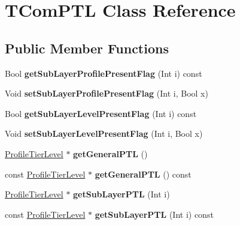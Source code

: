 \hypertarget{class_t_com_p_t_l}{}\section{T\+Com\+P\+TL Class Reference}
\label{class_t_com_p_t_l}
\subsection*{Public Member Functions}
\begin{DoxyCompactItemize}
\item 
\mbox{\label{class_t_com_p_t_l_a49a1ec26afd620b9fd1f248842a84b3d}} 
Bool {\bfseries get\+Sub\+Layer\+Profile\+Present\+Flag} (Int i) const
\item 
\mbox{\label{class_t_com_p_t_l_a55272dad771a9d43506e939a29630022}} 
Void {\bfseries set\+Sub\+Layer\+Profile\+Present\+Flag} (Int i, Bool x)
\item 
\mbox{\label{class_t_com_p_t_l_a6bc4f31d0371eaffe497c1a7c231d508}} 
Bool {\bfseries get\+Sub\+Layer\+Level\+Present\+Flag} (Int i) const
\item 
\mbox{\label{class_t_com_p_t_l_a452eea9f0b88a06fc890938247e2e652}} 
Void {\bfseries set\+Sub\+Layer\+Level\+Present\+Flag} (Int i, Bool x)
\item 
\mbox{\label{class_t_com_p_t_l_adbca26843f058ebc9b0bbd954c105e83}} 
\hyperlink{class_profile_tier_level}{Profile\+Tier\+Level} $\ast$ {\bfseries get\+General\+P\+TL} ()
\item 
\mbox{\label{class_t_com_p_t_l_ade956101723fc0b344db57b66f2756de}} 
const \hyperlink{class_profile_tier_level}{Profile\+Tier\+Level} $\ast$ {\bfseries get\+General\+P\+TL} () const
\item 
\mbox{\label{class_t_com_p_t_l_ac029d9ff80df20f94c92cd99a904320b}} 
\hyperlink{class_profile_tier_level}{Profile\+Tier\+Level} $\ast$ {\bfseries get\+Sub\+Layer\+P\+TL} (Int i)
\item 
\mbox{\label{class_t_com_p_t_l_a7bfa3899c1cfde16751f2e5432016615}} 
const \hyperlink{class_profile_tier_level}{Profile\+Tier\+Level} $\ast$ {\bfseries get\+Sub\+Layer\+P\+TL} (Int i) const
\end{DoxyCompactItemize}
